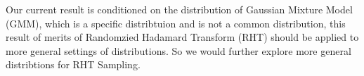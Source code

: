 \documentclass[11pt]{article}
\numberwithin{equation}{section}
\theoremstyle{plain}
\theoremstyle{definition}
\theoremstyle{remark}
\begin{document}
Our current result is conditioned on the distribution of Gaussian Mixture Model (GMM), which is a specific distribtuion and is not a common distribution, this result of merits of Randomzied Hadamard Transform (RHT) should be applied to more general settings of distributions. So we would further explore more general distribtions for RHT Sampling. 
\printbibliography %
\end{document}
